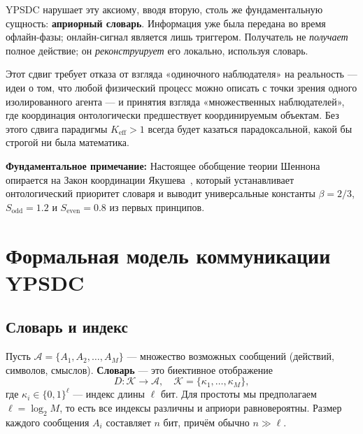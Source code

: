 \documentclass[12pt,a4paper]{article}
\theoremstyle{remark}
\begin{document}
	YPSDC нарушает эту аксиому, вводя вторую, столь же фундаментальную сущность: \textbf{априорный словарь}. Информация уже была передана во время офлайн-фазы; онлайн-сигнал является лишь триггером. Получатель не \emph{получает} полное действие; он \emph{реконструирует} его локально, используя словарь.
	
	Этот сдвиг требует отказа от взгляда «одиночного наблюдателя» на реальность — идеи о том, что любой физический процесс можно описать с точки зрения одного изолированного агента — и принятия взгляда «множественных наблюдателей», где координация онтологически предшествует координируемым объектам. Без этого сдвига парадигмы \(K_{\mathrm{eff}} > 1\) всегда будет казаться парадоксальной, какой бы строгой ни была математика.
	
	\medskip
	
	\textbf{Фундаментальное примечание:} Настоящее обобщение теории Шеннона опирается на Закон координации Якушева~\cite{YakushevLaw2026}, который устанавливает онтологический приоритет словаря и выводит универсальные константы \(\beta = 2/3\), \(S_{\mathrm{odd}} = 1.2\) и \(S_{\mathrm{even}} = 0.8\) из первых принципов.
	
	\section{Формальная модель коммуникации YPSDC}
	\label{sec:model}
	
	\subsection{Словарь и индекс}
	
	Пусть $\mathcal{A} = \{A_1, A_2, \dots, A_M\}$ — множество возможных сообщений (действий, символов, смыслов). \textbf{Словарь} — это биективное отображение
	\begin{equation}
		D: \mathcal{K} \to \mathcal{A}, \quad \mathcal{K} = \{\kappa_1, \dots, \kappa_M\},
	\end{equation}
	где $\kappa_i \in \{0,1\}^\ell$ — индекс длины $\ell$ бит. Для простоты мы предполагаем $\ell = \log_2 M$, то есть все индексы различны и априори равновероятны. Размер каждого сообщения $A_i$ составляет $n$ бит, причём обычно $n \gg \ell$.
	
\end{document}
